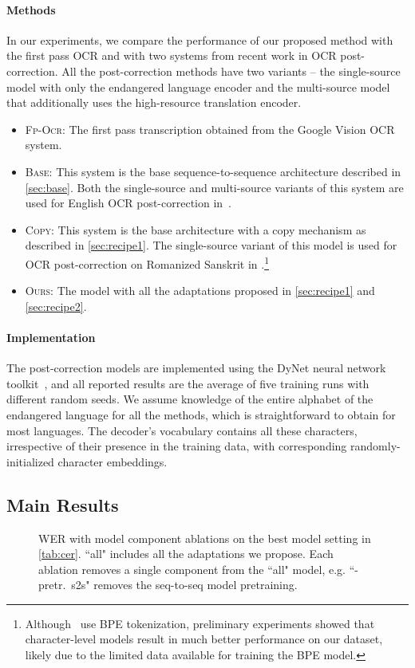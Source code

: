 \paragraph{Methods}
In our experiments, we compare the performance of our proposed method with the first pass OCR and with two systems from recent work in OCR post-correction. All the post-correction methods have two variants -- the single-source model with only the endangered language encoder and the multi-source model that additionally uses the high-resource translation encoder.
\begin{itemize}
    \item \textsc{Fp-Ocr}: The first pass transcription obtained from the Google Vision OCR system.
    \item \textsc{Base}: This system is the base sequence-to-sequence architecture described in \autoref{sec:base}. Both the single-source and multi-source variants of this system are used for English OCR post-correction in~\citet{dong-smith-2018-multi}. 
    \item \textsc{Copy}: This system is the base architecture with a copy mechanism as described in \autoref{sec:recipe1}. The single-source variant of this model is used for OCR post-correction on Romanized Sanskrit in \citet{krishna-etal-2018-upcycle}.\footnote{Although~\citet{krishna-etal-2018-upcycle} use BPE tokenization, preliminary experiments showed that character-level models result in much better performance on our dataset, likely due to the limited data available for training the BPE model.}
    \item \textsc{Ours}: The model with all the adaptations proposed in \autoref{sec:recipe1} and \autoref{sec:recipe2}.
\end{itemize}

\paragraph{Implementation} The post-correction models are implemented using the DyNet neural network toolkit~\cite{dynet}, and all reported results are the average of five training runs with different random seeds. We assume knowledge of the entire alphabet of the endangered language for all the methods, which is straightforward to obtain for most languages. The decoder's vocabulary contains all these characters, irrespective of their presence in the training data, with corresponding randomly-initialized character embeddings.

\subsection{Main Results}
\label{sec:results}

\begin{figure}[t]
    
    \caption{WER with model component ablations on the best model setting in \autoref{tab:cer}. ``all" includes all the adaptations we propose. Each ablation removes a single component from the ``all" model, e.g. ``-pretr.~s2s" removes the seq-to-seq model pretraining.}
    \label{fig:ablation}
\end{figure}

